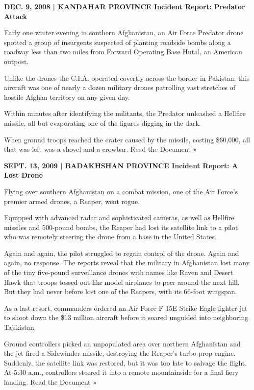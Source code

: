 ﻿\documentclass[12pt]{article}
\begin{document}
\textbf{DEC. 9, 2008 | KANDAHAR PROVINCE Incident Report: Predator Attack}

Early one winter evening in southern Afghanistan, an Air Force Predator drone spotted a group of
insurgents suspected of planting roadside bombs along a roadway less than two miles from Forward
Operating Base Hutal, an American outpost.

Unlike the drones the C.I.A. operated covertly across the border in Pakistan, this aircraft was one
of nearly a dozen military drones patrolling vast stretches of hostile Afghan territory on any given
day.

Within minutes after identifying the militants, the Predator unleashed a Hellfire missile, all but
evaporating one of the figures digging in the dark.

When ground troops reached the crater caused by the missile, costing \$60,000, all that was left was
a shovel and a crowbar. Read the Document »

\textbf{SEPT. 13, 2009 | BADAKHSHAN PROVINCE Incident Report: A Lost Drone}

Flying over southern Afghanistan on a combat mission, one of the Air Force's premier armed drones, a
Reaper, went rogue.

Equipped with advanced radar and sophisticated cameras, as well as Hellfire missiles and 500-pound
bombs, the Reaper had lost its satellite link to a pilot who was remotely steering the drone from a
base in the United States.

Again and again, the pilot struggled to regain control of the drone. Again and again, no response.
The reports reveal that the military in Afghanistan lost many of the tiny five-pound surveillance
drones with names like Raven and Desert Hawk that troops tossed out like model airplanes to peer
around the next hill. But they had never before lost one of the Reapers, with its 66-foot wingspan.

As a last resort, commanders ordered an Air Force F-15E Strike Eagle fighter jet to shoot down the
\$13 million aircraft before it soared unguided into neighboring Tajikistan.

Ground controllers picked an unpopulated area over northern Afghanistan and the jet fired a
Sidewinder missile, destroying the Reaper's turbo-prop engine. Suddenly, the satellite link was
restored, but it was too late to salvage the flight. At 5:30 a.m., controllers steered it into a
remote mountainside for a final fiery landing. Read the Document »
\end{document}
